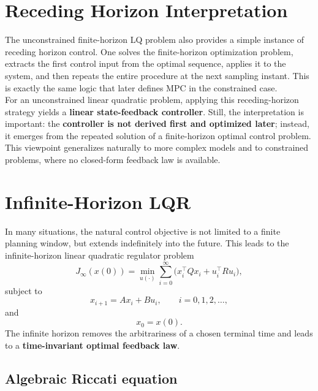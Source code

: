 \section{Receding Horizon Interpretation}

The unconstrained finite-horizon LQ problem also provides a simple instance of receding horizon control. One solves the finite-horizon optimization problem, extracts the first control input from the optimal sequence, applies it to the system, and then repeats the entire procedure at the next sampling instant. This is exactly the same logic that later defines MPC in the constrained case.\\

For an unconstrained linear quadratic problem, applying this receding-horizon strategy yields a \textbf{linear state-feedback controller}. Still, the interpretation is important: the \textbf{controller is not derived first and optimized later}; instead, it emerges from the repeated solution of a finite-horizon optimal control problem. This viewpoint generalizes naturally to more complex models and to constrained problems, where no closed-form feedback law is available.

\section{Infinite-Horizon LQR}

In many situations, the natural control objective is not limited to a finite planning window, but extends indefinitely into the future. This leads to the infinite-horizon linear quadratic regulator problem
\[
J_\infty(x(0))
=
\min_{u(\cdot)}
\sum_{i=0}^{\infty}
\bigl(x_i^\top Qx_i + u_i^\top Ru_i\bigr),
\]
subject to
\[
x_{i+1}=Ax_i+Bu_i, \qquad i=0,1,2,\dots,
\]
and
\[
x_0=x(0).
\]
The infinite horizon removes the arbitrariness of a chosen terminal time and leads to a \textbf{time-invariant optimal feedback law}.

\subsection{Algebraic Riccati equation}


